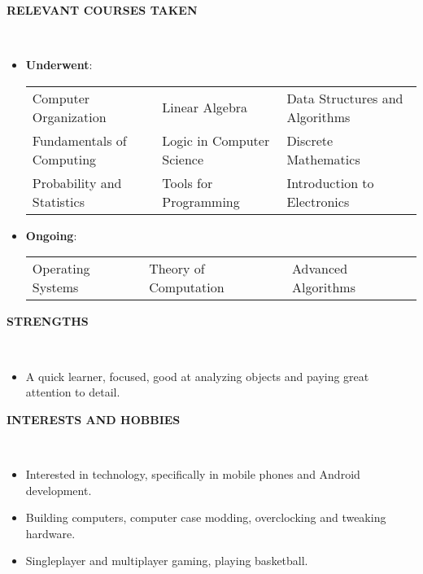 \documentclass[a4paper,10pt]{article}
\newcommand{\isep}{-2 pt}
\newcommand{\lsep}{-0.5cm}
\newcommand{\resheading}[1]{{\small \colorbox{mygrey}{\begin{minipage}{0.975\textwidth}{\textbf{#1 \vphantom{p\^{E}}}}\end{minipage}}}}
\begin{document}
\resheading{\textbf{RELEVANT COURSES TAKEN} }\\[\lsep]
\begin{itemize}
\item \textbf{Underwent}:\\
\begin{tabular}{ L{6.7cm} L{6.7cm} L{6.7cm} }
Computer Organization & Linear Algebra & Data Structures and Algorithms\\
Fundamentals of Computing & Logic in Computer Science & Discrete Mathematics\\
Probability and Statistics & Tools for Programming & Introduction to Electronics
\end{tabular}

\item \textbf{Ongoing}:\\
\begin{tabular}{ L{6.7cm} L{6.7cm} L{6.7cm} }
Operating Systems & Theory of Computation & Advanced Algorithms\\
\end{tabular}
\end{itemize}

\resheading{\textbf{STRENGTHS} }\\[\lsep]
\begin{itemize}
\item \noindent A quick learner, focused, good at analyzing objects and paying great attention to detail.
\end{itemize}

\resheading{\textbf{INTERESTS AND HOBBIES} }\\[\lsep]
\begin{itemize}\itemsep\isep
\item \noindent Interested in technology, specifically in mobile phones and Android development.
\item \noindent Building computers, computer case modding, overclocking and tweaking hardware.
\item \noindent Singleplayer and multiplayer gaming, playing basketball.
\end{itemize}
\end{document}
